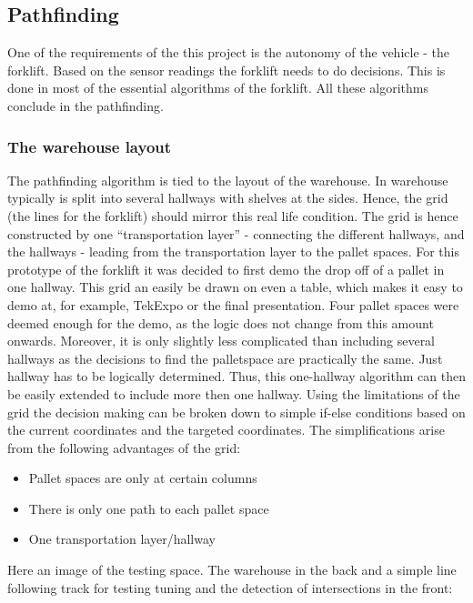 \documentclass[../report.tex]{subfiles}
\begin{document}
\subsection{Pathfinding}

One of the requirements of the this project is the autonomy of the vehicle - the forklift.
Based on the sensor readings the forklift needs to do decisions. This is done in most of
the essential algorithms of the forklift. All these algorithms conclude in the pathfinding.

\subsubsection{The warehouse layout}

The pathfinding algorithm is tied to the layout of the warehouse.
In warehouse typically is split into several hallways with shelves
at the sides. Hence, the grid (the lines for the forklift) should mirror this
real life condition. The grid is hence constructed 
by one ``transportation layer'' - connecting the different hallways, and the 
hallways - leading from the transportation layer to the pallet spaces. 
For this prototype of the forklift it was decided 
to first demo the drop off of a pallet in one hallway. This grid an easily be 
drawn on even a table, which makes it easy to demo at, for example, TekExpo or 
the final presentation. Four pallet spaces were deemed enough for the demo, as the logic
does not change from this amount onwards.
Moreover, it is only slightly less complicated
than including several hallways as the decisions to find the palletspace are 
practically the same. Just hallway has to be logically determined. Thus, this one-hallway algorithm
can then be easily extended to include more then one hallway. Using the limitations of
the grid the decision making can be broken down to simple if-else conditions 
based on the current coordinates and the targeted coordinates. The simplifications
arise from the following advantages of the grid:

\begin{itemize}
    \item Pallet spaces are only at certain columns
    \item There is only one path to each pallet space
    \item One transportation layer/hallway
\end{itemize}

Here an image of the testing space. The warehouse in the back and a simple
line following track for testing tuning and the detection of intersections 
in the front:
\end{document}
